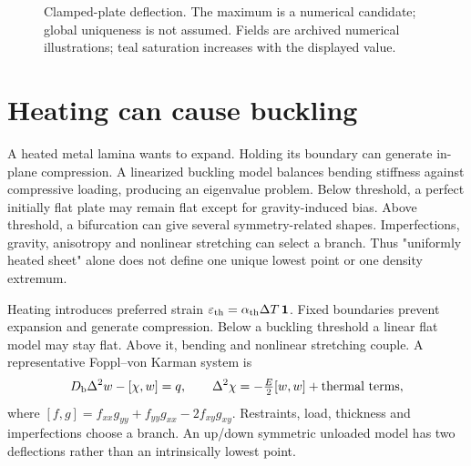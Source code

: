 \documentclass[11pt,oneside,openany]{book}
\begin{document}
\begin{figure}[htbp]
\caption[Clamped-plate deflection]{Clamped-plate deflection. The maximum is a numerical candidate; global uniqueness is not assumed. Fields are archived numerical illustrations; teal saturation increases with the displayed value.}\label{fig:field-Pgrav}
\end{figure}

\section{Heating can cause buckling}\label{sec:slide41}

A heated metal lamina wants to expand. Holding its boundary can generate in-plane compression. A linearized buckling model balances bending stiffness against compressive loading, producing an eigenvalue problem. Below threshold, a perfect initially flat plate may remain flat except for gravity-induced bias. Above threshold, a bifurcation can give several symmetry-related shapes. Imperfections, gravity, anisotropy and nonlinear stretching can select a branch. Thus "uniformly heated sheet" alone does not define one unique lowest point or one density extremum.



Heating introduces preferred strain
$\varepsilon_{\rm th}=\alpha_{\rm th}\Delta T\,\mathbf1$.
Fixed boundaries prevent expansion and generate compression.
Below a buckling threshold a linear flat model may stay flat.
Above it, bending and nonlinear stretching couple. A representative
Foppl--von Karman system is
\[
D_{\rm b}\Delta^2w-[\chi,w]=q,\qquad
\Delta^2\chi=-\tfrac E2[w,w]+\hbox{thermal terms},
\]
where $[f,g]=f_{xx}g_{yy}+f_{yy}g_{xx}-2f_{xy}g_{xy}$.
Restraints, load, thickness and imperfections choose a branch.
An up/down symmetric unloaded model has two deflections rather than
an intrinsically lowest point.
\end{document}
